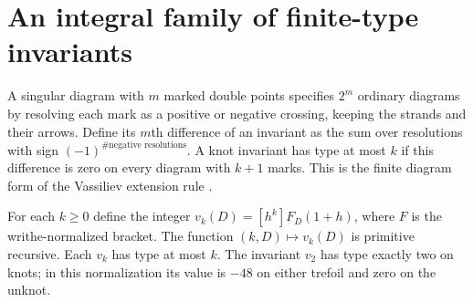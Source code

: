 \section{An integral family of finite-type invariants}
\label{sec:finite-type}
A singular diagram with $m$ marked double points specifies $2^m$ ordinary diagrams by resolving each mark as a positive or negative crossing, keeping the strands and their arrows. Define its $m$th difference of an invariant as the sum over resolutions with sign $(-1)^{\#\text{negative resolutions}}$. A knot invariant has type at most $k$ if this difference is zero on every diagram with $k+1$ marks. This is the finite diagram form of the Vassiliev extension rule \cite{birmanlin}.

\begin{theorem}\label{th:finite-type}
For each $k\ge0$ define the integer $v_k(D)=[h^k]F_D(1+h)$, where $F$ is the writhe-normalized bracket. The function $(k,D)\mapsto v_k(D)$ is primitive recursive. Each $v_k$ has type at most $k$. The invariant $v_2$ has type exactly two on knots; in this normalization its value is $-48$ on either trefoil and zero on the unknot.
\end{theorem}
